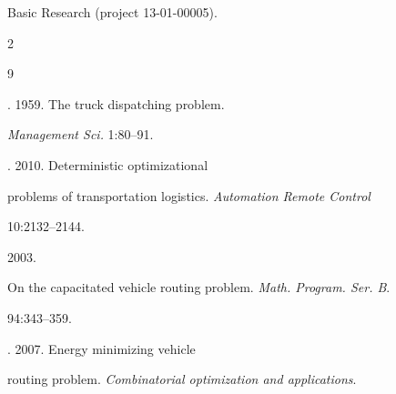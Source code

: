 Basic Research (project 13-01-00005).
















  \begin{multicols}{2}





\renewcommand{\bibname}{\protect\rmfamily References}













{\small\frenchspacing


 {%




 \begin{thebibliography}{9}




. 1959. The truck dispatching problem.


\textit{Management Sci.} 1:80--91.




. 2010. Deterministic optimizational


problems of transportation logistics. \textit{Automation Remote Control}


10:2132--2144.




 2003.


On the capacitated vehicle routing problem. \textit{Math. Program. Ser. B}.


94:343--359.




. 2007. Energy minimizing vehicle


routing problem. \textit{Combinatorial optimization and applications}.



\end{thebibliography}}}
\end{multicols}
